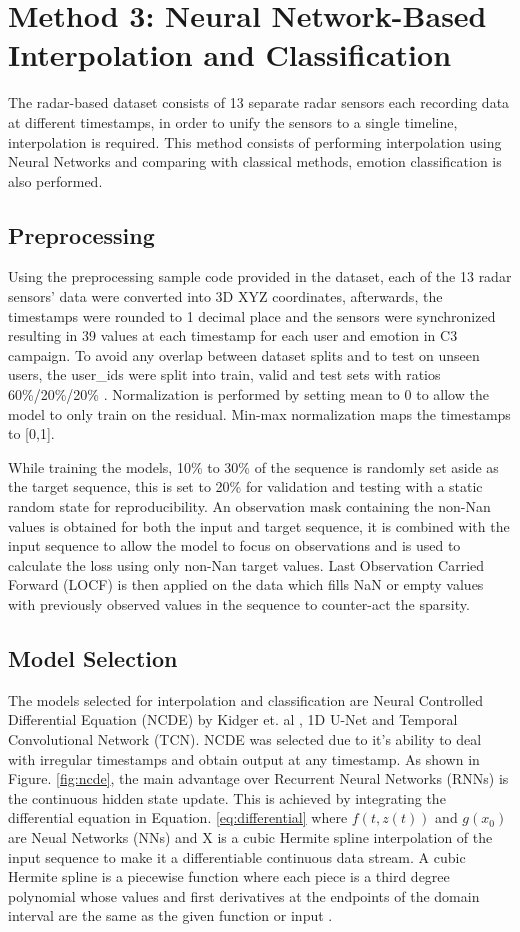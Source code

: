 \documentclass{article}
\begin{document}
\section{Method 3: Neural Network-Based Interpolation and Classification}
The radar-based dataset consists of 13 separate radar sensors each recording data at different timestamps, in order to unify the sensors to a single timeline, interpolation is required. This method consists of performing interpolation using Neural Networks and comparing with classical methods, emotion classification is also performed.
\subsection{Preprocessing}
Using the preprocessing sample code provided in the dataset, each of the 13 radar sensors' data were converted into 3D XYZ coordinates, afterwards, the timestamps were rounded to 1 decimal place and the sensors were synchronized resulting in 39 values at each timestamp for each user and emotion in C3 campaign. To avoid any overlap between dataset splits and to test on unseen users, the user\_ids were split into train, valid and test sets with ratios 60\%/20\%/20\% . Normalization is performed by setting mean to 0 to allow the model to only train on the residual. Min-max normalization maps the timestamps to [0,1].

While training the models, 10\% to 30\% of the sequence is randomly set aside as the target sequence, this is set to 20\% for validation and testing with a static random state for reproducibility. An observation mask containing the non-Nan values is obtained for both the input and target sequence, it is combined with the input sequence to allow the model to focus on observations and is used to calculate the loss using only non-Nan target values. Last Observation Carried Forward (LOCF) is then applied on the data which fills NaN or empty values with previously observed values in the sequence to counter-act the sparsity.

\subsection{Model Selection}
The models selected for interpolation and classification are Neural Controlled Differential Equation (NCDE) by Kidger et. al \cite{kidger2020neuralcde}, 1D U-Net and Temporal Convolutional Network (TCN). NCDE was selected due to it's ability to deal with irregular timestamps and obtain output at any timestamp. As shown in Figure. \ref{fig:ncde}, the main advantage over Recurrent Neural Networks (RNNs) is the continuous hidden state update. This is achieved by integrating the differential equation in Equation. \ref{eq:differential} where \(f(t,z(t))\) and \(g(x_0)\) are Neual Networks (NNs) and X is a cubic Hermite spline interpolation of the input sequence to make it a differentiable continuous data stream. A cubic Hermite spline is a piecewise function where each piece is a third degree polynomial whose values and first derivatives at the endpoints of the domain interval are the same as the given function or input \cite{kreyszig11}.
\end{document}
